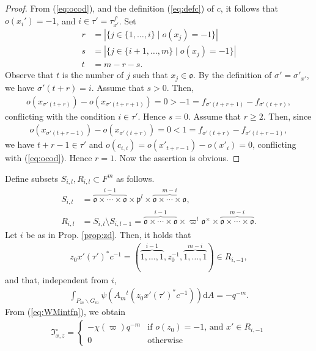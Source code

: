 \documentclass[11pt]{amsart}
\newcommand\s{\sigma}%
\newcommand\Vp{\varpi}%
\newcommand\vp{\varphi}%
\newcommand\oo{\mathfrak{o}}
\newcommand\If{\mathfrak{I}}
\newcommand\p{{\mathfrak{p}}}
\newcommand\dr{\mathrm{d}}
\newcommand\1{\mathbf{1}}
\newcommand\nid{\noindent}
\newcommand\bs{\backslash}%
\newcommand\tm{\times}
\numberwithin{equation}{section}
\begin{document}
\begin{proof}
From (\ref{eq:ocod}), and the definition (\ref{eq:defc}) of $c$, it follows that $o(x_i') = -1$, and $i \in \tau' = \tau_{x'}^{f^i}$.
Set 
\begin{align*}
 r &= |\{j \in \{1,\ldots, i \} \mid o(x_j) =-1 \}| \\
 s &= |\{j \in \{i+1,\ldots, m \} \mid o(x_j) =-1 \}| \\
 t &= m -r-s.
 \end{align*}
Observe that $t$ is the number of $j$ such that $x_j \in \oo$.
By the definition of $\s' = \s'_{x'}$, we have $\s'(t+r) = i$.
Assume that $s > 0$.
Then, 
\begin{align*}
o(x_{\s'(t+r)}) -o(x_{\s'(t+r+1)}) =0 >-1 =  f_{\s'(t+r+1)} -f_{\s'(t+r)}, 
\end{align*}
conflicting with the condition $i \in \tau'$.
Hence $s = 0$.
Assume that $r \ge 2$.
Then, since
\begin{align*}
o(x_{\s'(t+r-1)}) -o(x_{\s'(t+r)}) =0 < 1 =  f_{\s'(t+r)} -f_{\s'(t+r-1)}, 
\end{align*}
we have $t+r-1 \in \tau'$ and $o(c_{i,i}) = o(x'_{t+r-1}) - o(x'_i) = 0$, conflicting with (\ref{eq:ocod}).
Hence $r = 1$.
Now the assertion is obvious.
\end{proof}
\nid
Define subsets $S_{i,l}, R_{i,l} \subset F^m$ as follows.
\begin{align*}
S_{i,l} &= \overbrace{\oo \tm \cdots \tm \oo}^{i-1} \tm \p^{l} \tm \overbrace{\oo \tm \cdots \tm \oo}^{m-i}, \\
R_{i,l} &= S_{i,l} \setminus S_{i,l-1} = \overbrace{\oo \tm \cdots \tm \oo}^{i-1} \tm \Vp^{l} \oo^\tm \tm \overbrace{\oo \tm \cdots \tm \oo}^{m-i}.
\end{align*} 
Let $i$ be as in Prop. \ref{prop:zd}.
Then, it holds that 
\begin{align*}
z_0x'(\tau')^*c^{-1} = (\overbrace{1, \ldots, 1}^{i-1}, z_0^{-1}, \overbrace{1, \ldots, 1}^{m-i}) \in R_{i,-1}, 
\end{align*}
and that, independent from $i$, 
\begin{align*} 
\int_{P_m\bs G_m} \psi(A_m {}^t(z_0 x'(\tau')^*c^{-1})) \dr A = -q^{-m}.
\end{align*}
From (\ref{eq:WMintfn}), we obtain 
\begin{align*}
\If_{x,z}^\circ = 
\begin{cases}
-\chi(\Vp) q^{-m} & \mbox{if $o(z_0) = -1$, and $x' \in R_{i,-1}$} \\
0 & \mbox{otherwise} 
\end{cases}
\end{align*} 
\end{document}
